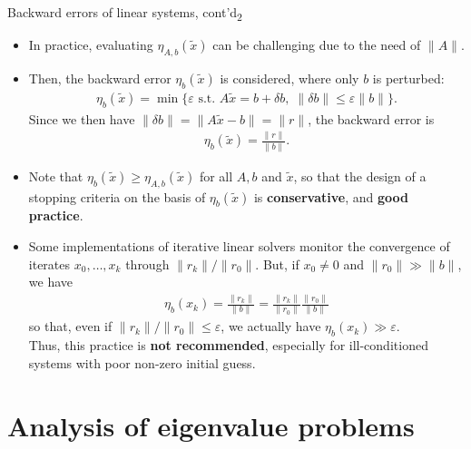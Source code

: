 \documentclass[t,usepdftitle=false]{beamer}
\begin{document}
\begin{frame}{Backward errors of linear systems, cont'd\textsubscript{2}}
\begin{itemize}
\item In practice, evaluating $\eta_{A,b}(\tilde{x})$ can be challenging
due to the need of $\|A\|$.
\item Then, the backward error $\eta_b(\tilde{x})$ is considered, where only $b$ is perturbed:\vspace{-.05cm}
\begin{align*}
\eta_{b}(\tilde{x})=\min
\{\varepsilon\text{ s.t. }
A\tilde{x}=b+\delta b,\;
\|\delta b\|\leq\varepsilon\|b\|\}.
\end{align*}
Since we then have $\|\delta b\|=\|A\tilde{x}-b\|=\|r\|$, the backward error is\
\begin{align*}
\eta_{b}(\tilde{x})=\frac{\|r\|}{\|b\|}.
\end{align*}
\item Note that $\eta_{b}(\tilde{x})\geq \eta_{A,b}(\tilde{x})$ for all $A,b$ and $\tilde{x}$, so that the design of a stopping criteria on the basis of $\eta_{b}(\tilde{x})$ is \textbf{conservative}, and \textbf{good practice}.
\item Some implementations of iterative linear solvers monitor the convergence of iterates $x_0,\dots,x_k$ through $\|r_k\|/\|r_0\|$.
But, if $x_0\neq 0$ and $\|r_0\|\gg\|b\|$, we have\vspace{-.35cm}
\begin{align*}
\eta_b(x_k)=\frac{\|r_k\|}{\|b\|}=\frac{\|r_k\|}{\|r_0\|}\frac{\|r_0\|}{\|b\|}
\end{align*}
so that, even if $\|r_k\|/\|r_0\|\leq \varepsilon$, we actually have $\eta_b(x_k)\gg\varepsilon$.\vspace{.05cm}\\
Thus, this practice is \textbf{not recommended}, especially for ill-conditioned systems with poor non-zero initial guess.
\end{itemize}
\end{frame}


\section{Analysis of eigenvalue problems}
\end{document}
